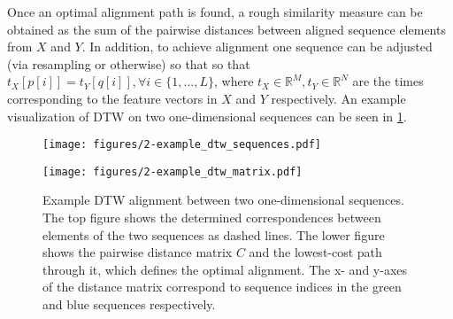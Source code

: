 Once an optimal alignment path is found, a rough similarity measure can be obtained as the sum of the pairwise distances between aligned sequence elements from $X$ and $Y$.
In addition, to achieve alignment one sequence can be adjusted (via resampling or otherwise) so that so that $t_X[p[i]] = t_Y[q[i]], \forall i \in \{1, \ldots, L\}$, where $t_X \in \mathbb{R}^M, t_Y \in \mathbb{R}^N$ are the times corresponding to the feature vectors in $X$ and $Y$ respectively.
An example visualization of DTW on two one-dimensional sequences can be seen in \cref{fig:example_dtw}.

\begin{figure}
  \centering
  \texttt{[image: figures/2-example\_dtw\_sequences.pdf]}

  \texttt{[image: figures/2-example\_dtw\_matrix.pdf]}
  \caption[DTW alignment of two signals]{Example DTW alignment between two one-dimensional sequences.  The top figure shows the determined correspondences between elements of the two sequences as dashed lines.  The lower figure shows the pairwise distance matrix $C$ and the lowest-cost path through it, which defines the optimal alignment.  The x- and y-axes of the distance matrix correspond to sequence indices in the green and blue sequences respectively.}
  \label{fig:example_dtw}
\end{figure}
